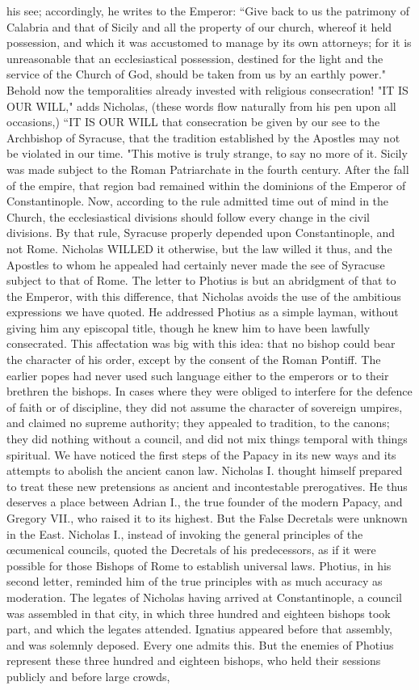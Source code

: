 his see; accordingly, he writes to the Emperor: “Give back to us the patrimony of Calabria and that of Sicily and all the property of our church, whereof it held possession, and which it was accustomed to manage by its own attorneys; for it is unreasonable that an ecclesiastical possession, destined for the light and the service of the Church of God, should be taken from us by an earthly power." Behold now the temporalities already invested with religious consecration! "IT IS OUR WILL," adds Nicholas, (these words flow naturally from his pen upon all occasions,) “IT IS OUR WILL that consecration be given by our see to the Archbishop of Syracuse, that the tradition established by the Apostles may not be violated in our time. "This motive is truly strange, to say no more of it. Sicily was made subject to the Roman Patriarchate in the fourth century. After the fall of the empire, that region bad remained within the dominions of the Emperor of Constantinople. Now, according to the rule admitted time out of mind in the Church, the ecclesiastical divisions should follow every change in the civil divisions. By that rule, Syracuse properly depended upon Constantinople, and not Rome. Nicholas WILLED it otherwise, but the law willed it thus, and the Apostles to whom he appealed had certainly never made the see of Syracuse subject to that of Rome. The letter to Photius is but an abridgment of that to the Emperor, with this difference, that Nicholas avoids the use of the ambitious expressions we have quoted. He addressed Photius as a simple layman, without giving him any episcopal title, though he knew him to have been lawfully consecrated. This affectation was big with this idea: that no bishop could bear the character of his order, except by the consent of the Roman Pontiff. The earlier popes had never used such language either to the emperors or to their brethren the bishops. In cases where they were obliged to interfere for the defence of faith or of discipline, they did not assume the character of sovereign umpires, and claimed no supreme authority; they appealed to tradition, to the canons; they did nothing without a council, and did not mix things temporal with things spiritual. We have noticed the first steps of the Papacy in its new ways and its attempts to abolish the ancient canon law. Nicholas I. thought himself prepared to treat these new pretensions as ancient and incontestable prerogatives. He thus deserves a place between Adrian I., the true founder of the modern Papacy, and Gregory VII., who raised it to its highest. But the False Decretals were unknown in the East. Nicholas I., instead of invoking the general principles of the œcumenical councils, quoted the Decretals of his predecessors, as if it were possible for those Bishops of Rome to establish universal laws. Photius, in his second letter, reminded him of the true principles with as much accuracy as moderation. The legates of Nicholas having arrived at Constantinople, a council was assembled in that city, in which three hundred and eighteen bishops took part, and which the legates attended. Ignatius appeared before that assembly, and was solemnly deposed. Every one admits this. But the enemies of Photius represent these three hundred and eighteen bishops, who held their sessions publicly and before large crowds, 